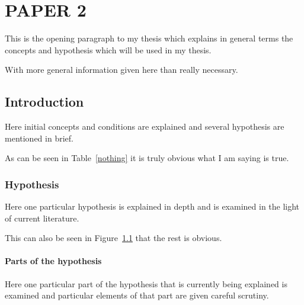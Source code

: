 \chapter{PAPER 2}

This is the opening paragraph to my thesis which
explains in general terms the concepts and hypothesis
which will be used in my thesis.

With more general information given here than really
necessary.

\section{Introduction}

Here initial concepts and conditions are explained and
several hypothesis are mentioned in brief.

As can be seen in Table~\ref{nothing} it is truly
obvious what I am saying is true.

\begin{table}[h!tb] \centering
{}
\label{nothing}

\vspace{ 2 in}
\end{table}

\subsection{Hypothesis}

Here one particular hypothesis is explained in depth
and is examined in the light of current literature.

This can also be seen in Figure~\ref{moon} that the
rest is obvious.

\begin{figure}[h!tb] \centering

\vspace{ 2 in}
\label{moon}
\end{figure}

\subsubsection{Parts of the hypothesis}

Here one particular part of the hypothesis that is 
currently being explained is examined and particular
elements of that part are given careful scrutiny.

